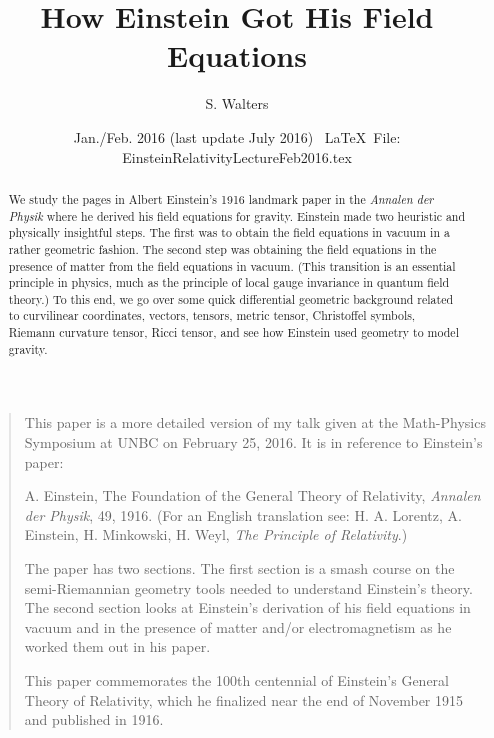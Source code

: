 \documentclass[12pt,reqno]{amsart}
\theoremstyle{definition}
\numberwithin{equation}{section}
\begin{document}
\title[H\lowercase{ow} E\lowercase{instein} G\lowercase{ot} H\lowercase{is} F\lowercase{ield} E\lowercase{quations}]
{\LARGE \rm H\lowercase{ow} E\lowercase{instein} G\lowercase{ot} H\lowercase{is} F\lowercase{ield} E\lowercase{quations}}

\author{S. W\lowercase{alters}}
\date{{Jan./Feb. 2016 (last update July 2016)} \ \hfill {\scriptsize \LaTeX\ 
File: EinsteinRelativityLectureFeb2016.tex}}
\address{Department of Mathematics and Statistics, University  of Northern B.C., Prince George, B.C. V2N 4Z9, Canada.}
\email[]{walters@unbc.ca}
\urladdr{http://hilbert.unbc.ca/}


\begin{abstract}
We study the pages in Albert Einstein's 1916 landmark paper in the {\it Annalen der Physik} where he derived his field equations for gravity. Einstein made two heuristic and physically insightful steps. The first was to obtain the field equations in vacuum in a rather geometric fashion. The second step was obtaining the field equations in the presence of matter from the field equations in vacuum. (This transition is an essential principle in physics, much as the principle of local gauge invariance in quantum field theory.) To this end, we  go over some quick differential geometric background related to curvilinear coordinates, vectors, tensors, metric tensor, Christoffel symbols, Riemann curvature tensor, Ricci tensor, and see how Einstein used geometry to model gravity.
\end{abstract}


\maketitle

\bigskip

\begin{quote}
This paper is a more detailed version of my talk given at the Math-Physics Symposium at UNBC on February 25, 2016. It is in reference to Einstein's paper:

\bigskip

A. Einstein, The Foundation of the General Theory of Relativity, {\it Annalen der Physik}, 49, 1916. (For an English translation see: H. A. Lorentz, A. Einstein, H. Minkowski, H. Weyl, {\it The Principle of Relativity}.)

\bigskip

The paper has two sections. The first section is a smash course on the semi-Riemannian geometry tools needed to understand Einstein's theory. The second section looks at Einstein's derivation of his field equations in vacuum and in the presence of matter and/or electromagnetism as he worked them out in his paper.

\bigskip

This paper commemorates the 100th centennial of Einstein's General Theory of Relativity, which he finalized near the end of November 1915 and published in 1916.

\end{quote}
\end{document}
